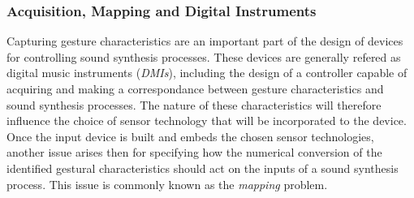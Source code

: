 {{%




			\subsubsection{Acquisition, Mapping and Digital Instruments}
			\label{subsubsubsec:CM_Control_GC_GA}

Capturing gesture characteristics are an important part of the design of devices for controlling sound synthesis processes. These devices are generally refered as digital music instruments (\emph{DMIs}), including the design of a controller capable of acquiring and making a correspondance between gesture characteristics and sound synthesis processes. The nature of these characteristics will therefore influence the choice of sensor technology that will be incorporated to the device.\\

Once the input device is built and embeds the chosen sensor technologies, another issue arises then for specifying how the numerical conversion of the identified gestural characteristics should act on the inputs of a sound synthesis process. This issue is commonly known as the \emph{mapping} problem.


}}
